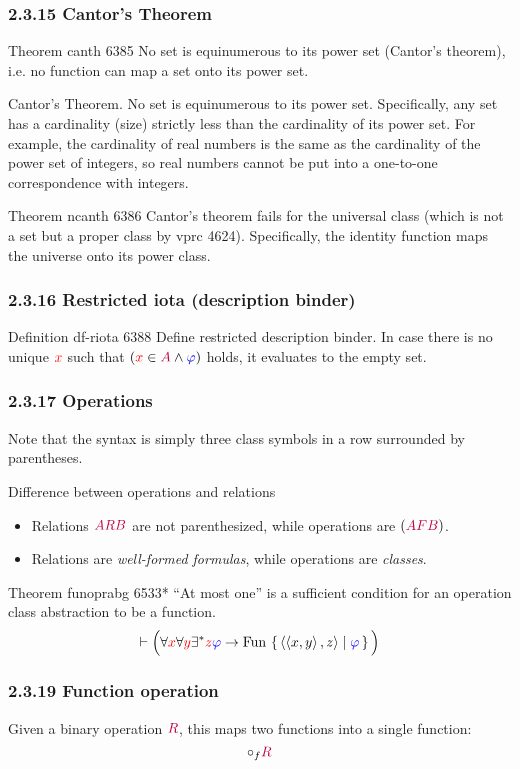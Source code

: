 \documentclass[12pt, letterpaper]{article}
\newcommand{\red}[1]{{\color{red} #1}}
\newcommand{\blue}[1]{{\color{blue} #1}}
\newcommand{\purple}[1]{{\color{purple} #1}}
\newcommand{\provable}{\vdash}
\newcommand{\ra}{\rightarrow}
\newcommand{\setvar}{\red}
\newcommand{\wff}{\blue}
\newcommand{\classvar}{\purple}
\newcommand{\wffphi}{\wff{\varphi}}
\newcommand{\sx}{\setvar{x}}
\newcommand{\sy}{\setvar{y}}
\newcommand{\sz}{\setvar{z}}
\newcommand{\clA}{\classvar{A}}
\newcommand{\clB}{\classvar{B}}
\newcommand{\clF}{\classvar{F}}
\newcommand{\clR}{\classvar{R}}
\newcommand{\unique}{\exists^*}
\newcommand{\Fun}{{\operatorname{Fun}\,}}
\newcommand{\opair}[2]{\left\langle{#1,#2}\right\rangle}
\theoremstyle{definition}
\theoremstyle{remark}
\theoremstyle{definition}
\theoremstyle{plain}
\begin{document}
	\subsubsection*{2.3.15  Cantor's Theorem}
	Theorem	canth 6385	No set is equinumerous to its power set (Cantor's theorem), i.e. no function can map a set onto its power set.
	
	Cantor's Theorem. No set is equinumerous to its power set. Specifically, any set has a cardinality (size) strictly less than the cardinality of its power set. For example, the cardinality of real numbers is the same as the cardinality of the power set of integers, so real numbers cannot be put into a one-to-one correspondence with integers.
	
	Theorem	ncanth 6386	Cantor's theorem fails for the universal class (which is not a set but a proper class by vprc 4624). Specifically, the identity function maps the universe onto its power class.	
	
	\subsubsection*{2.3.16  Restricted iota (description binder)}
	Definition	df-riota 6388	Define restricted description binder. In case there is no unique $\sx$ such that $(\sx \in \clA \land \wffphi)$ holds, it evaluates to the empty set. 
	
	\subsubsection*{2.3.17  Operations}
	
	Note that the syntax is simply three class symbols in a row surrounded by parentheses.
	
	Difference between operations and relations
	\begin{itemize}
		\item Relations $\clA\clR\clB$ are not parenthesized,
		while operations are $(\clA\clF\clB)$.
		\item Relations are \textit{well-formed formulas},
		while operations are \textit{classes}.
	\end{itemize}

	Theorem	funoprabg 6533*	``At most one'' is a sufficient condition for an operation class abstraction to be a function.
	\[\provable\Big( \forall\sx\forall\sy\unique\sz\wffphi\ra \Fun\set{\opair{\opair{x}{y}}{z}|\wffphi}\Big) \]
	
	\subsubsection*{2.3.19  Function operation}
	Given a binary operation $\clR$, this maps two functions into a single function:
	\[ \circ_f\clR \]
	
\end{document}
